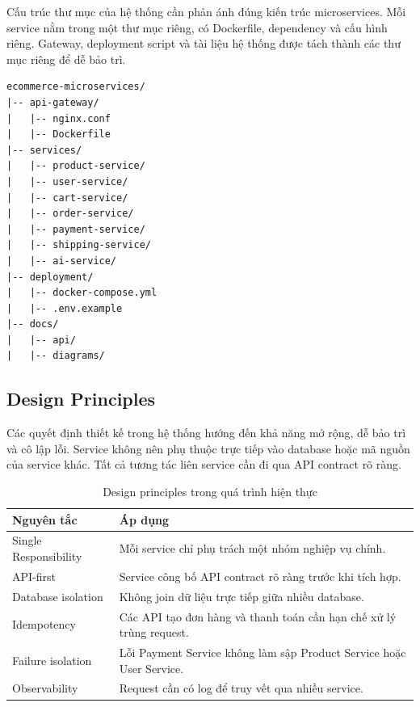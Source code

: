 \documentclass[../main.tex]{subfiles}
\begin{document}
Cấu trúc thư mục của hệ thống cần phản ánh đúng kiến trúc microservices. Mỗi service nằm trong một thư mục riêng, có Dockerfile, dependency và cấu hình riêng. Gateway, deployment script và tài liệu hệ thống được tách thành các thư mục riêng để dễ bảo trì.

\begin{lstlisting}[caption={Cấu trúc thư mục hệ thống}, label={lst:chapter4-system-structure}]
ecommerce-microservices/
|-- api-gateway/
|   |-- nginx.conf
|   |-- Dockerfile
|-- services/
|   |-- product-service/
|   |-- user-service/
|   |-- cart-service/
|   |-- order-service/
|   |-- payment-service/
|   |-- shipping-service/
|   |-- ai-service/
|-- deployment/
|   |-- docker-compose.yml
|   |-- .env.example
|-- docs/
|   |-- api/
|   |-- diagrams/
\end{lstlisting}

\subsection{Design Principles}
\label{subsection:4.2.7}

Các quyết định thiết kế trong hệ thống hướng đến khả năng mở rộng, dễ bảo trì và cô lập lỗi. Service không nên phụ thuộc trực tiếp vào database hoặc mã nguồn của service khác. Tất cả tương tác liên service cần đi qua API contract rõ ràng.

\begin{table}[H]
    \centering
    \caption{Design principles trong quá trình hiện thực}
    \label{tab:chapter4-design-principles}
    \begin{tabular}{|p{}|p{}|}
        \hline
        \rowcolor{primary!35}
        \textbf{Nguyên tắc} & \textbf{Áp dụng} \\
        \hline
        Single Responsibility & Mỗi service chỉ phụ trách một nhóm nghiệp vụ chính. \\
        \hline
        API-first & Service công bố API contract rõ ràng trước khi tích hợp. \\
        \hline
        Database isolation & Không join dữ liệu trực tiếp giữa nhiều database. \\
        \hline
        Idempotency & Các API tạo đơn hàng và thanh toán cần hạn chế xử lý trùng request. \\
        \hline
        Failure isolation & Lỗi Payment Service không làm sập Product Service hoặc User Service. \\
        \hline
        Observability & Request cần có log để truy vết qua nhiều service. \\
        \hline
    \end{tabular}
\end{table}
\end{document}
